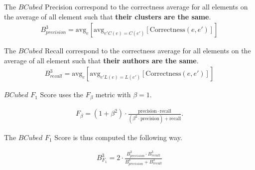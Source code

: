 \begin{definition}
  The $BCubed$ Precision correspond to the correctness average for all elements on the average of all element such that \textbf{their clusters are the same}.
  \begin{gather*}
    B^3_{precision} = \mathrm{avg}_{e}[\mathrm{avg}_{e' C(e)=C(e')}[\mathrm{Correctness}(e, e')]]
  \end{gather*}
\end{definition}

\begin{definition}
  The $BCubed$ Recall correspond to the correctness average for all elements on the average of all element such that \textbf{their authors are the same}.
  \begin{gather*}
    B^3_{recall} = \mathrm{avg}_{e}[\mathrm{avg}_{e' L(e)=L(e')}[\mathrm{Correctness}(e, e')]]
  \end{gather*}
\end{definition}

\begin{definition}
  $BCubed$ $F_1$ Score uses the $F_{\beta}$ metric with $\beta = 1$.

  \begin{gather*}
    F_\beta = (1 + \beta^2) \cdot \frac{\mathrm{precision} \cdot \mathrm{recall}}{(\beta^2 \cdot \mathrm{precision}) + \mathrm{recall}}.
  \end{gather*}

  The $BCubed$ $F_1$ Score is thus computed the following way.

  \begin{gather*}
    B^3_{F_1} =
    2 \cdot \frac{B^3_{precision} \cdot B^3_{recall}} {B^3_{precision} + B^3_{recall}}
  \end{gather*}
\end{definition}

